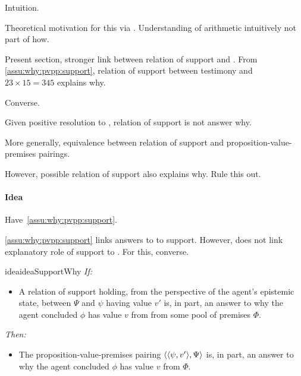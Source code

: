 \begin{note}
  Intuition.

  Theoretical motivation for this via \issueInclusion{}.
  Understanding of arithmetic intuitively not part of how.
\end{note}

\begin{note}
  Present section, stronger link between relation of support and \qWhy{}.
  From \autoref{assu:why:pvpp:support}, relation of support between testimony and \(23 \times 15 = 345\) explains why.

  Converse.

  Given positive resolution to \issueInclusion{}, relation of support is not answer why.

  More generally, equivalence between relation of support and proposition-value-premises pairings.


  However, possible relation of support also explains why.
  Rule this out.
\end{note}

\paragraph{Idea}
\label{sec:clar:expand:qWhy:idea}

\begin{note}
  Have~\autoref{assu:why:pvpp:support}.

  \autoref{assu:why:pvpp:support} links answers to \qWhy{} to support.
  However, does not link explanatory role of support to \qWhy{}.
  For this, converse.
\end{note}

\begin{note}
  \begin{restatable}{idea}{ideaSupportWhy}
    \label{assu:why:support:pvpp}
    \emph{If:}
    \begin{itemize}
    \item
      A relation of support holding, from the perspective of the agent's epistemic state, between \(\Psi\) and \(\psi\) having value \(v'\) is, in part, an answer to why the agent concluded \(\phi\) has value \(v\) from from some pool of premises \(\Phi\).
    \end{itemize}
    \emph{Then:}
    \begin{itemize}
    \item
      The proposition-value-premises pairing \(\langle \langle \psi, v' \rangle, \Psi \rangle\) is, in part, an answer to why the agent concluded \(\phi\) has value \(v\) from \(\Phi\).
    \end{itemize}
    \vspace{-\baselineskip}
  \end{restatable}
\end{note}

